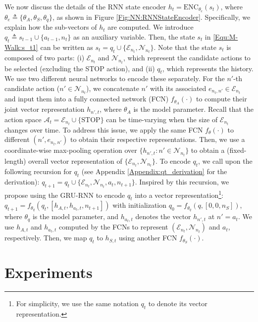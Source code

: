 \documentclass{article}
\newcommand{\defeq}{\triangleq}
\newcommand{\mc}{\mathcal}
\newcommand{\modelname}{M-Walk}
\begin{document}
	We now discuss the details of the RNN state encoder $h_t = \mathrm{ENC}_{\theta_e}(s_t)$, where $\theta_e \defeq \{\theta_A,\theta_S,\theta_q\}$, as shown in Figure \ref{Fig:NN:RNNStateEncoder}. Specifically, we explain how the sub-vectors of $h_t$ are computed. We introduce $q_t \defeq s_{t-1} \cup \{a_{t-1}, n_t\}$ as an auxiliary variable. Then, the state $s_t$ in \eqref{Equ:\modelname:s_t1} can be written as $s_t = q_t \cup \{\mc{E}_{n_t}, \mc{N}_{n_t}\}$. Note that the state $s_t$ is composed of two parts: (i) $\mc{E}_{n_t}$ and $\mc{N}_{n_t}$, which represent the candidate actions to be selected (excluding the STOP action), and (ii) $q_t$, which represents the history. We use two different neural networks to encode these separately. For the $n'$-th candidate action ($n' \in \mc{N}_{n_t}$), we concatenate $n'$ with its associated $e_{n_t,n'} \in \mc{E}_{n_t}$ and input them into a fully connected network (FCN) $f_{\theta_A}(\cdot)$ to compute their joint vector representation $h_{n',t}$, where $\theta_A$ is the model parameter. Recall that the action space $\mc{A}_t = \mc{E}_{n_t} \cup \{\mathrm{STOP}\}$ can be time-varying when the size of $\mc{E}_{n_t}$ changes over time. To address this issue, we apply the same FCN $f_{\theta}(\cdot)$ to different $(n',e_{n_t,n'})$ to obtain their respective representations. Then, we use a coordinate-wise max-pooling operation over $\{h_{n',t}: n' \in \mc{N}_{n_t}\}$ to obtain a (fixed-length) overall vector representation of $\{\mc{E}_{n_t}, \mc{N}_{n_t}\}$. To encode $q_t$, we call upon the following recursion for $q_t$ (see Appendix \ref{Appendix:qt_derivation} for the derivation): $q_{t+1} = q_t \cup \{ \mc{E}_{n_t}, \mc{N}_{n_t}, a_t, n_{t+1} \}$. Inspired by this recursion, we propose using the GRU-RNN \cite{cho2014learning} to encode $q_t$ into a vector representation\footnote{For simplicity, we use the same notation $q_t$ to denote its vector representation.}: $q_{t+1}=f_{\theta_q}(q_{t}, [h_{A,t}, h_{a_{t},t}, n_{t+1}])$ with initialization $q_0=f_{\theta_q}(q,[0,0,n_S])$, where $\theta_q$ is the model parameter, and $h_{a_t,t}$ denotes the vector $h_{n',t}$ at $n'=a_t$. We use $h_{A,t}$ and $h_{a_t,t}$ computed by the FCNs to represent $(\mc{E}_{n_t},\mc{N}_{n_t})$ and $a_t$, respectively. Then, we map $q_t$ to $h_{S,t}$ using another FCN $f_{\theta_S}(\cdot)$. 


	
	
	
	
	
\section{Experiments}
\label{Sec:Experiments}
\end{document}
